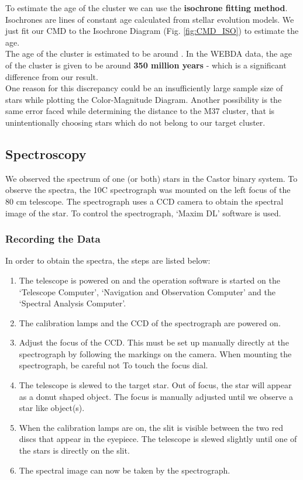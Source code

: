 \documentclass[12pt,a4paper]{article}
\begin{document}
To estimate the age of the cluster we can use the \textbf{isochrone fitting method}. Isochrones are lines of constant age calculated from stellar evolution models. We just fit our CMD to the Isochrone Diagram (Fig. \ref{fig:CMD_ISO}) to estimate the age.
\\ The age of the cluster is estimated to be around . In the WEBDA data, the age of the cluster is given to be around \textbf{ 350 million years} - which is a significant difference from our result.
\\ One reason for this discrepancy could be an insufficiently large sample size of stars while plotting the Color-Magnitude Diagram. Another possibility is the same error faced while determining the distance to the M37 cluster, that is unintentionally choosing stars which do not belong to our target cluster.


\subsection{Spectroscopy}

    We observed the spectrum of one (or both) stars in the Castor binary system. To observe the spectra, the 10C spectrograph was mounted on the 
    left focus of the 80 cm telescope. The spectrograph uses a CCD camera to obtain the spectral image of the star. To control the spectrograph, `Maxim DL'
    software is used. 
    \subsubsection{Recording the Data}
      In order to obtain the spectra, the steps are listed below:
      \begin{enumerate}
        \item The telescope is powered on and the operation software is started on the `Telescope Computer', `Navigation and Observation Computer' and the `Spectral Analysis Computer'.
        \item The calibration lamps and the CCD of the spectrograph are powered on.
        \item Adjust the focus of the CCD. This must be set up manually directly at the spectrograph by following the markings on the camera. When mounting the spectrograph, be careful not To
              touch the focus dial.
        \item The telescope is slewed to the target star. Out of focus, the star will appear as a donut shaped object. The focus is manually adjusted until we observe a star like object(s).
        \item When the calibration lamps are on, the slit is visible between the two red discs that appear in the eyepiece. The telescope is slewed slightly until one of the stars is directly on the slit. 
        \item The spectral image can now be taken by the spectrograph. 
      \end{enumerate}
\end{document}
